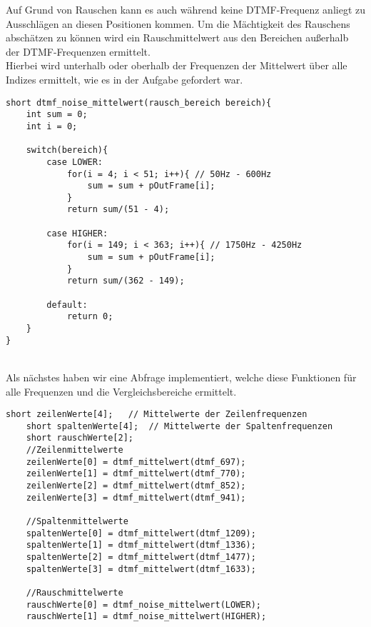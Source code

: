 Auf Grund von Rauschen kann es auch während keine DTMF-Frequenz anliegt zu Ausschlägen an diesen Positionen kommen. Um die Mächtigkeit des Rauschens abschätzen zu können wird ein Rauschmittelwert aus den Bereichen außerhalb der DTMF-Frequenzen ermittelt.\\
Hierbei wird unterhalb oder oberhalb der Frequenzen der Mittelwert über alle Indizes ermittelt, wie es in der Aufgabe gefordert war.\\
 \begin{adjustbox}{width=\textwidth, keepaspectratio} 
  \label{code:procdataKompFIR}
  \begin{lstlisting}[title=Bestimmung Rauschmittelwert]
short dtmf_noise_mittelwert(rausch_bereich bereich){
	int sum = 0;
	int i = 0;
	
	switch(bereich){
		case LOWER:
			for(i = 4; i < 51; i++){ // 50Hz - 600Hz
				sum = sum + pOutFrame[i];
			}
			return sum/(51 - 4);
		
		case HIGHER:
			for(i = 149; i < 363; i++){ // 1750Hz - 4250Hz
				sum = sum + pOutFrame[i];
			}
			return sum/(362 - 149);

		default:
			return 0;	
	}
}
\end{lstlisting}
\end{adjustbox}\\
Als nächstes haben wir eine Abfrage implementiert, welche diese Funktionen für alle Frequenzen und die Vergleichsbereiche ermittelt.\\
 \begin{adjustbox}{width=\textwidth, keepaspectratio} 
  \label{code:procdataKompFIR}
  \begin{lstlisting}[title=Ermittlung der einzelnen Mittelwerte]
short zeilenWerte[4]; 	// Mittelwerte der Zeilenfrequenzen
	short spaltenWerte[4]; 	// Mittelwerte der Spaltenfrequenzen
	short rauschWerte[2];
	//Zeilenmittelwerte
	zeilenWerte[0] = dtmf_mittelwert(dtmf_697);
	zeilenWerte[1] = dtmf_mittelwert(dtmf_770);
	zeilenWerte[2] = dtmf_mittelwert(dtmf_852);
	zeilenWerte[3] = dtmf_mittelwert(dtmf_941);
	
	//Spaltenmittelwerte
	spaltenWerte[0] = dtmf_mittelwert(dtmf_1209);
	spaltenWerte[1] = dtmf_mittelwert(dtmf_1336);
	spaltenWerte[2] = dtmf_mittelwert(dtmf_1477);
	spaltenWerte[3] = dtmf_mittelwert(dtmf_1633);
	
	//Rauschmittelwerte
	rauschWerte[0] = dtmf_noise_mittelwert(LOWER);
	rauschWerte[1] = dtmf_noise_mittelwert(HIGHER);
\end{lstlisting}
\end{adjustbox}\\
